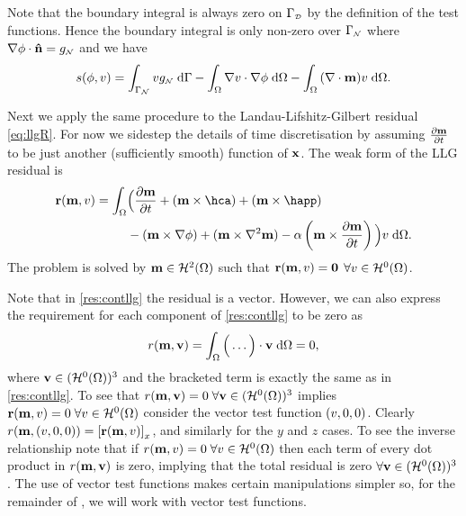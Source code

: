 Note that the boundary integral is always zero on ${\Gamma}_{\scriptscriptstyle{\mathcal{D}}}$ by the definition of the test functions.
Hence the boundary integral is only non-zero over ${\Gamma}_{{\scriptscriptstyle{\mathcal{N}}}}$ where $\nabla \phi \cdot \boldsymbol{\mathrm{\hat{n}}} = g_{{\scriptscriptstyle{\mathcal{N}}}}$ and we have
\begin{equation}
  s(\phi, v) = \int_{{\Gamma}_{\scriptscriptstyle{\mathcal{N}}}} v g_{\scriptscriptstyle{\mathcal{N}}} {\; \mathrm{{d}}} {\Gamma}
  - {\int_{\Omega} { \nabla v \cdot \nabla \phi} {\; \mathrm{{d}}} {\Omega}}
  - {\int_{\Omega} { (\nabla \cdot \boldsymbol{\mathrm{m}}) v} {\; \mathrm{{d}}} {\Omega}}.
  \label{res:contphi}
\end{equation}

Next we apply the same procedure to the Landau-Lifshitz-Gilbert residual \cref{eq:llgR}.
For now we sidestep the details of time discretisation by assuming $\frac{\partial \boldsymbol{\mathrm{m}}}{\partial t}$ to be just another (sufficiently smooth) function of $\boldsymbol{\mathrm{x}}$.
The weak form of the LLG residual is
\begin{equation}
  \begin{aligned}
    \rllgv(\mv, \test) = \int_\magd &\Big( \dmdt
    + (\mv \times \hca) + (\mv \times \happ) \\
    &- (\mv \times \grad \phi) + (\mv \times \lap \mv) - \dampc \left( \mv
      \times \dmdt \right) \Big) \test \d\magd.
    \label{res:contllg}
  \end{aligned}
\end{equation}
The problem is solved by $\boldsymbol{\mathrm{m}} \in \mathcal{H}^2(\Omega)$ such that $\boldsymbol{\mathrm{r}}(\boldsymbol{\mathrm{m}}, v) = \mathbf{0}$ $\forall v \in \mathcal{H}^0(\Omega)$.

Note that in \cref{res:contllg} the residual is a vector.
However, we can also express the requirement for each component of \cref{res:contllg} to be zero as
\begin{equation}
  r(\boldsymbol{\mathrm{m}}, \boldsymbol{\mathrm{v}}) = \int_\Omega \Big( \ldots  \Big) \cdot \boldsymbol{\mathrm{v}} {\; \mathrm{{d}}}\Omega = 0,
\end{equation}
where $\boldsymbol{\mathrm{v}} \in (\mathcal{H}^0(\Omega))^3$ and the bracketed term is exactly the same as in \cref{res:contllg}.
To see that $r(\boldsymbol{\mathrm{m}}, \boldsymbol{\mathrm{v}}) = 0\; \forall \boldsymbol{\mathrm{v}} \in (\mathcal{H}^0(\Omega))^3$ implies $\boldsymbol{\mathrm{r}}(\boldsymbol{\mathrm{m}}, v) = 0 \; \forall v \in \mathcal{H}^0(\Omega)$ consider the vector test function $(v, 0, 0)$.
Clearly $r(\boldsymbol{\mathrm{m}}, (v, 0, 0)) = {\left[ \boldsymbol{\mathrm{r}}(\boldsymbol{\mathrm{m}}, v) \right]}_x$, and similarly for the $y$ and $z$ cases.
To see the inverse relationship note that if $r(\boldsymbol{\mathrm{m}}, v) = 0\; \forall v \in \mathcal{H}^0(\Omega)$ then each term of every dot product in $r(\boldsymbol{\mathrm{m}}, \boldsymbol{\mathrm{v}})$ is zero, implying that the total residual is zero $\forall \boldsymbol{\mathrm{v}} \in (\mathcal{H}^0(\Omega))^3$.
The use of vector test functions makes certain manipulations simpler so, for the remainder of , we will work with vector test functions.

